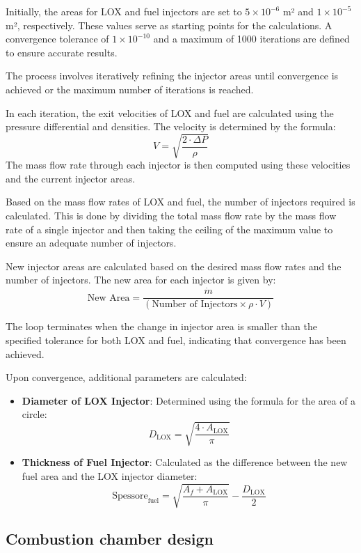 Initially, the areas for LOX and fuel injectors are set to \(5 \times 10^{-6}\) m² and \(1 \times 10^{-5}\) m², respectively. These values serve as starting points for the calculations. A convergence tolerance of \(1 \times 10^{-10}\) and a maximum of 1000 iterations are defined to ensure accurate results.

The process involves iteratively refining the injector areas until convergence is achieved or the maximum number of iterations is reached.


In each iteration, the exit velocities of LOX and fuel are calculated using the pressure differential and densities. The velocity is determined by the formula:
\[
V = \sqrt{\frac{2 \cdot \Delta P}{\rho}}
\]
The mass flow rate through each injector is then computed using these velocities and the current injector areas.

Based on the mass flow rates of LOX and fuel, the number of injectors required is calculated. This is done by dividing the total mass flow rate by the mass flow rate of a single injector and then taking the ceiling of the maximum value to ensure an adequate number of injectors.

New injector areas are calculated based on the desired mass flow rates and the number of injectors. The new area for each injector is given by:
\[
\text{New Area} = \frac{\dot{m}}{(\text{Number of Injectors} \times \rho \cdot V)}
\]

The loop terminates when the change in injector area is smaller than the specified tolerance for both LOX and fuel, indicating that convergence has been achieved.

Upon convergence, additional parameters are calculated:
\begin{itemize}
    \item \textbf{Diameter of LOX Injector}: Determined using the formula for the area of a circle: \[
D_{\text{LOX}} = \sqrt{\frac{4 \cdot A_{\text{LOX}}}{\pi}}
\]
    \item \textbf{Thickness of Fuel Injector}: Calculated as the difference between the new fuel area and the LOX injector diameter: \[
\text{Spessore}_{\text{fuel}} = \sqrt{\frac{A_f + A_{\text{LOX}}}{\pi}} - \frac{D_{\text{LOX}}}{2}
\]
\end{itemize}

\subsection{Combustion chamber design}
